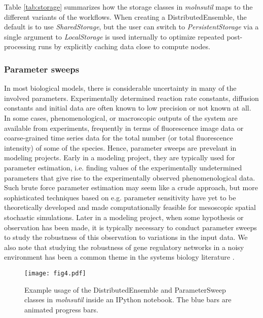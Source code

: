 \documentclass[final,leqno,onefignum,onetabnum]{siamltex1213}
\begin{document}
Table \ref{tab:storage} summarizes how the storage classes in \emph{molnsutil} maps to the different variants of the workflows. When creating a DistributedEnsemble, the default is to use \emph{SharedStorage}, but the user can switch to \emph{PersistentStorage} via a single argument to   \emph{LocalStorage} is used internally to optimize repeated post-processing runs by explicitly caching data close to compute nodes.  


\subsubsection{Parameter sweeps}
\label{sec:parametersweeps}
In most biological models, there is considerable uncertainty in many of the involved parameters. Experimentally determined reaction rate constants, diffusion constants and initial data are often known to low precision or not known at all. In some cases, phenomenological, or macroscopic outputs of the system are available from experiments, frequently in terms of fluorescence image data or coarse-grained time series data for the total number (or total fluorescence intensity) of some of the species. Hence, parameter sweeps are prevelant in modeling projects. Early in a modeling project, they are typically used for parameter estimation, i.e. finding values of the experimentally undetermined parameters that give rise to the experimentally observed phenomenological data. Such brute force parameter estimation may seem like a crude approach, but more sophisticated techniques based on e.g. parameter sensitivity have yet to be theoretically developed and made computationally feasible for mesoscopic spatial stochastic simulations. Later in a modeling project, when some hypothesis or observation has been made, it is typically necessary to conduct parameter sweeps to study the robustness of this observation to variations in the input data. We also note that studying the robustness of gene regulatory networks in a noisy environment has been a common theme in the systems biology literature \cite{12237400, Sturrock2013, lawson2013}.

\begin{figure}[htpb]
\begin{center}
\texttt{[image: fig4.pdf]}
\end{center}
\caption{Example usage of the DistributedEnsemble and ParameterSweep classes in \emph{molnsutil} inside an IPython notebook.  The blue bars are animated progress bars. }
\label{fig:distributedensemble}
\end{figure}
\end{document}
